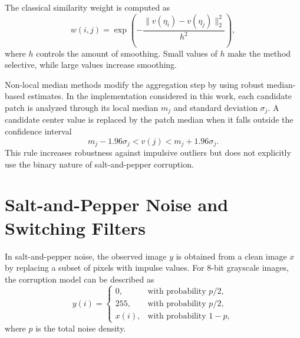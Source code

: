\documentclass{ieeeaccess}
\begin{document}
The classical similarity weight is computed as
\begin{equation}
w(i,j) =
\exp\left(
-\frac{\|v(\eta_i)-v(\eta_j)\|_2^2}{h^2}
\right),
\label{eq:nlm_weight}
\end{equation}
where $h$ controls the amount of smoothing. Small values of $h$ make the method selective, while large values increase smoothing.

Non-local median methods modify the aggregation step by using robust median-based estimates. In the implementation considered in this work, each candidate patch is analyzed through its local median $m_j$ and standard deviation $\sigma_j$. A candidate center value is replaced by the patch median when it falls outside the confidence interval
\begin{equation}
m_j - 1.96\sigma_j < v(j) < m_j + 1.96\sigma_j.
\label{eq:nlmedian_interval}
\end{equation}
This rule increases robustness against impulsive outliers but does not explicitly use the binary nature of salt-and-pepper corruption.

\section{Salt-and-Pepper Noise and Switching Filters}
\label{sec:spnoise}

In salt-and-pepper noise, the observed image $y$ is obtained from a clean image $x$ by replacing a subset of pixels with impulse values. For 8-bit grayscale images, the corruption model can be described as
\begin{equation}
y(i)=
\begin{cases}
0, & \text{with probability } p/2,\\
255, & \text{with probability } p/2,\\
x(i), & \text{with probability } 1-p,
\end{cases}
\label{eq:sp_model}
\end{equation}
where $p$ is the total noise density.
\end{document}
